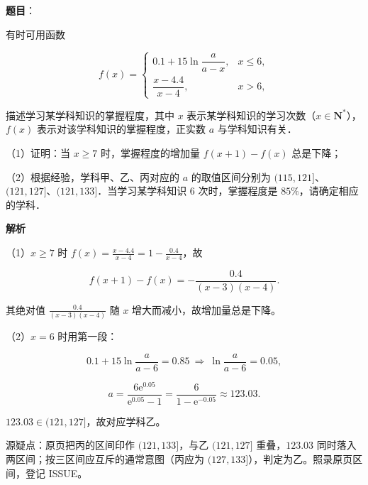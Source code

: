 \begin{answer}

\textbf{题目}：

有时可用函数

\nopagebreak[4]
\[f(x)=\begin{cases}0.1+15\ln\dfrac{a}{a-x},&x\leqslant6,\\[6pt] \dfrac{x-4.4}{x-4},&x>6,\end{cases}\]

描述学习某学科知识的掌握程度，其中 $x$ 表示某学科知识的学习次数（$x\in\mathbf N^*$），$f(x)$ 表示对该学科知识的掌握程度，正实数 $a$ 与学科知识有关．

（1）证明：当 $x\geqslant7$ 时，掌握程度的增加量 $f(x+1)-f(x)$ 总是下降；

（2）根据经验，学科甲、乙、丙对应的 $a$ 的取值区间分别为 $(115,121]$、$(121,127]$、$(121,133]$．当学习某学科知识 $6$ 次时，掌握程度是 $85\%$，请确定相应的学科．

\textbf{解析}

（1）$x\geqslant7$ 时 $f(x)=\frac{x-4.4}{x-4}=1-\frac{0.4}{x-4}$，故

\nopagebreak[4]
\[f(x+1)-f(x)=-\frac{0.4}{(x-3)(x-4)} .\]

其绝对值 $\frac{0.4}{(x-3)(x-4)}$ 随 $x$ 增大而减小，故增加量总是下降。

（2）$x=6$ 时用第一段：

\nopagebreak[4]
\[0.1+15\ln\frac{a}{a-6}=0.85\ \Longrightarrow\ \ln\frac{a}{a-6}=0.05,\]

\nopagebreak[4]
\[a=\frac{6\mathrm e^{0.05}}{\mathrm e^{0.05}-1}=\frac{6}{1-\mathrm e^{-0.05}}\approx123.03 .\]

$123.03\in(121,127]$，故对应学科乙。

\begin{gktip}
源疑点：原页把丙的区间印作 $(121,133]$，与乙 $(121,127]$ 重叠，$123.03$ 同时落入两区间；按三区间应互斥的通常意图（丙应为 $(127,133]$），判定为乙。照录原页区间，登记 ISSUE。
\end{gktip}


\end{answer}
